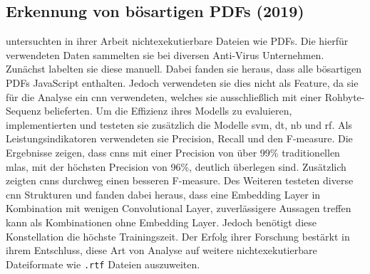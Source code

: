\documentclass[
    12pt, %
    DIV10,
    ngerman, %
    a4paper, %
    oneside, %
    titlepage, %
    parskip=half, %
    headings=normal, %
    listof=totoc, %
    bibliography=totoc, %
    index=totoc, %
    captions=tableheading, %
    final %
]{scrreprt}
\begin{document}
\subsection{Erkennung von bösartigen PDFs (2019)}
\textcite{Jeong2019} untersuchten in ihrer Arbeit nichtexekutierbare Dateien wie PDFs. Die hierfür verwendeten Daten sammelten sie bei diversen Anti-Virus Unternehmen. Zunächst labelten sie diese manuell. Dabei fanden sie heraus, dass alle bösartigen PDFs JavaScript enthalten. Jedoch verwendeten sie dies nicht als Feature, da sie für die Analyse ein \ac{cnn} verwendeten, welches sie ausschlie{\ss}lich mit einer Rohbyte-Sequenz belieferten. Um die Effizienz ihres Modells zu evaluieren, implementierten und testeten sie zusätzlich die Modelle \ac{svm}, \ac{dt}, \acl{nb} und \ac{rf}. Als Leistungsindikatoren verwendeten sie Precision, Recall und den F-measure. Die Ergebnisse zeigen, dass \ac{cnns} mit einer Precision von über 99\% traditionellen \ac{mlas}, mit der höchsten Precision von 96\%, deutlich überlegen sind. Zusätzlich zeigten \ac{cnns} durchweg einen besseren F-measure. Des Weiteren testeten \textcite{Jeong2019} diverse \ac{cnn} Strukturen und fanden dabei heraus, dass eine Embedding Layer in Kombination mit wenigen Convolutional Layer, zuverlässigere Aussagen treffen kann als Kombinationen ohne Embedding Layer. Jedoch benötigt diese Konstellation die höchste Trainingszeit. Der Erfolg ihrer Forschung bestärkt \textcite{Jeong2019} in ihrem Entschluss, diese Art von Analyse auf weitere nichtexekutierbare Dateiformate wie \texttt{.rtf} Dateien auszuweiten.
\newpage
\end{document}
